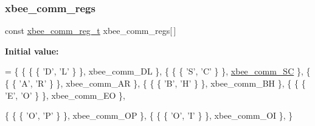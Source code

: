\subsubsection{\texorpdfstring{xbee\+\_\+comm\+\_\+regs}{xbee\_comm\_regs}}
{\footnotesize\ttfamily const \hyperlink{structxbee__comm__reg__t}{xbee\+\_\+comm\+\_\+reg\+\_\+t} xbee\+\_\+comm\+\_\+regs\mbox{[}$\,$\mbox{]}}

{\bfseries Initial value\+:}
\begin{DoxyCode}
= \{
   \{ \{ \{ \textcolor{charliteral}{'D'}, \textcolor{charliteral}{'L'} \} \}, xbee\_comm\_DL \},
   \{ \{ \{ \textcolor{charliteral}{'S'}, \textcolor{charliteral}{'C'} \} \}, \hyperlink{group__xbee__commissioning_ga886012f757de4a74d0c992d3ab04a373}{xbee\_comm\_SC} \},
   \{ \{ \{ \textcolor{charliteral}{'A'}, \textcolor{charliteral}{'R'} \} \}, xbee\_comm\_AR \},
   \{ \{ \{ \textcolor{charliteral}{'B'}, \textcolor{charliteral}{'H'} \} \}, xbee\_comm\_BH \},
   \{ \{ \{ \textcolor{charliteral}{'E'}, \textcolor{charliteral}{'O'} \} \}, xbee\_comm\_EO \},
   
   \{ \{ \{ \textcolor{charliteral}{'O'}, \textcolor{charliteral}{'P'} \} \}, xbee\_comm\_OP \},
   \{ \{ \{ \textcolor{charliteral}{'O'}, \textcolor{charliteral}{'I'} \} \}, xbee\_comm\_OI \},
\}
\end{DoxyCode}
